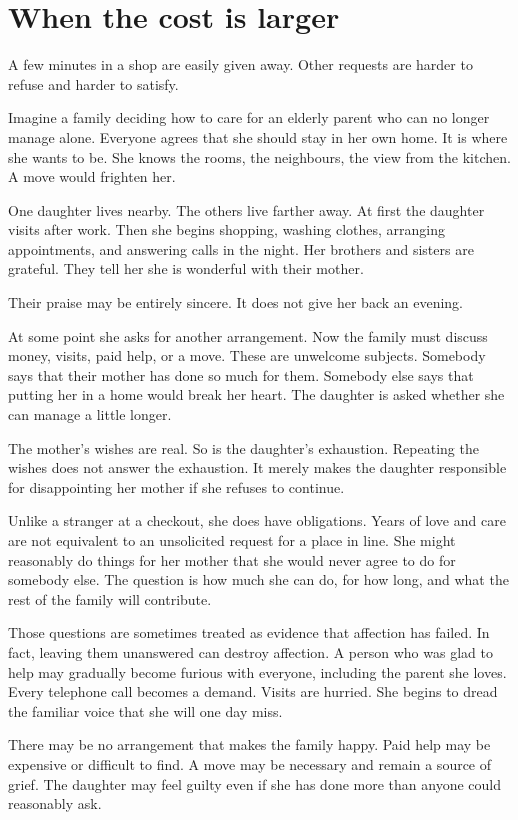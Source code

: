 \documentclass[12pt,a4paper]{book}
\begin{document}
\section*{When the cost is larger}

A few minutes in a shop are easily given away. Other requests are harder to refuse and harder to satisfy.

Imagine a family deciding how to care for an elderly parent who can no longer manage alone. Everyone agrees that she should stay in her own home. It is where she wants to be. She knows the rooms, the neighbours, the view from the kitchen. A move would frighten her.

One daughter lives nearby. The others live farther away. At first the daughter visits after work. Then she begins shopping, washing clothes, arranging appointments, and answering calls in the night. Her brothers and sisters are grateful. They tell her she is wonderful with their mother.

Their praise may be entirely sincere. It does not give her back an evening.

At some point she asks for another arrangement. Now the family must discuss money, visits, paid help, or a move. These are unwelcome subjects. Somebody says that their mother has done so much for them. Somebody else says that putting her in a home would break her heart. The daughter is asked whether she can manage a little longer.

The mother's wishes are real. So is the daughter's exhaustion. Repeating the wishes does not answer the exhaustion. It merely makes the daughter responsible for disappointing her mother if she refuses to continue.

Unlike a stranger at a checkout, she does have obligations. Years of love and care are not equivalent to an unsolicited request for a place in line. She might reasonably do things for her mother that she would never agree to do for somebody else. The question is how much she can do, for how long, and what the rest of the family will contribute.

Those questions are sometimes treated as evidence that affection has failed. In fact, leaving them unanswered can destroy affection. A person who was glad to help may gradually become furious with everyone, including the parent she loves. Every telephone call becomes a demand. Visits are hurried. She begins to dread the familiar voice that she will one day miss.

There may be no arrangement that makes the family happy. Paid help may be expensive or difficult to find. A move may be necessary and remain a source of grief. The daughter may feel guilty even if she has done more than anyone could reasonably ask.
\end{document}
